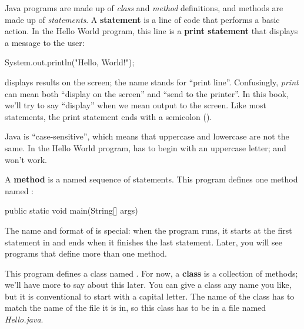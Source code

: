 
Java programs are made up of {\em class} and {\em method} definitions, and methods are made up of {\em statements}.
A {\bf statement} is a line of code that performs a basic action.
In the Hello World program, this line is a {\bf print statement} that displays a message to the user:

\begin{code}
System.out.println("Hello, World!");
\end{code}


 displays results on the screen; the name  stands for ``print line''.
Confusingly, {\em print} can mean both ``display on the screen'' and ``send to the printer''.
In this book, we'll try to say ``display'' when we mean output to the screen.
Like most statements, the print statement ends with a semicolon (\java{;}).


Java is ``case-sensitive'', which means that uppercase and lowercase are not the same.
In the Hello World program,  has to begin with an uppercase letter;  and  won't work.


A {\bf method} is a named sequence of statements.
This program defines one method named :

\begin{code}
public static void main(String[] args)
\end{code}


The name and format of  is special: when the program runs, it starts at the first statement in  and ends when it finishes the last statement.
Later, you will see programs that define more than one method.


This program defines a class named .
For now, a {\bf class} is a collection of methods; we'll have more to say about this later.
You can give a class any name you like, but it is conventional to start with a capital letter.
The name of the class has to match the name of the file it is in, so this class has to be in a file named {\it Hello.java}.


